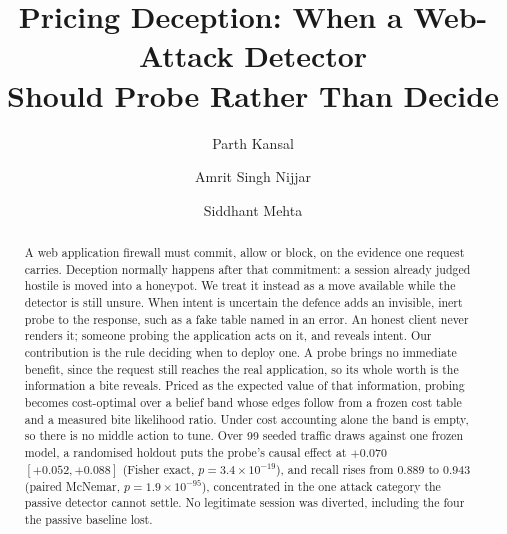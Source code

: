 \documentclass[runningheads]{llncs}
\begin{document}
\title{Pricing Deception: When a Web-Attack Detector\\Should Probe Rather Than Decide}

\author{Parth Kansal \and Amrit Singh Nijjar \and Siddhant Mehta}

\maketitle

\begin{abstract}
A web application firewall must commit, allow or block, on the evidence one request
carries. Deception normally happens after that commitment: a session already judged
hostile is moved into a honeypot. We treat it instead as a move available while the
detector is still unsure. When intent is uncertain the defence adds an invisible,
inert probe to the response, such as a fake table named in an error. An honest
client never renders it; someone probing the application acts on it, and reveals
intent. Our contribution is the rule deciding when to deploy one. A probe brings no
immediate benefit, since the request still reaches the real application, so its
whole worth is the information a bite reveals. Priced as the expected value of that
information, probing becomes cost-optimal over a belief band whose edges follow from
a frozen cost table and a measured bite likelihood ratio. Under cost accounting
alone the band is empty, so there is no middle action to tune. Over 99 seeded
traffic draws against one frozen model, a randomised holdout puts the probe's causal
effect at $+0.070$ $[+0.052, +0.088]$ (Fisher exact, $p = 3.4 \times 10^{-19}$), and
recall rises from 0.889 to 0.943 (paired McNemar, $p = 1.9 \times 10^{-95}$),
concentrated in the one attack category the passive detector cannot settle. No
legitimate session was diverted, including the four the passive baseline lost.

\end{abstract}
\end{document}
